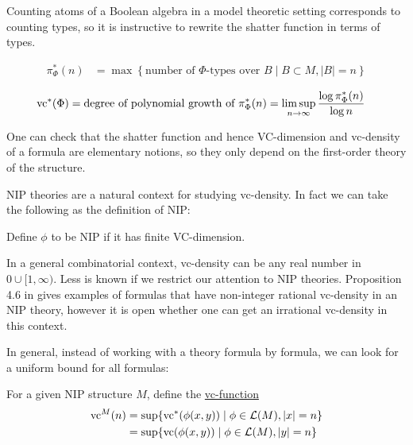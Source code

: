 \documentclass{amsart}
\renewcommand{\LL}{\mathcal L}
\newcommand{\curly}[1]{\left\{#1\right\}}
\newcommand{\defn}{\underline}
\begin{document}
Counting atoms of a Boolean algebra in a model theoretic setting corresponds to counting types,
so it is instructive to rewrite the shatter function in terms of types.

\begin{Definition} 
  \begin{align*}
    \pi^*_\Phi(n) &= \max \curly{\text{number of $\Phi$-types over $B$} \mid B \subset M, |B| = n}
  \end{align*}
\end{Definition}  

\begin{Lemma} \label{count_types}
  \begin{align*}
    \operatorname{vc}^*(\Phi) &= \text{degree of polynomial growth of $\pi^*_\Phi(n)$}  = \limsup_{n \to \infty}\frac{\log \pi^*_\Phi(n)}{\log n}
  \end{align*}  
\end{Lemma}

One can check that the shatter function and hence VC-dimension and vc-density of a formula are elementary notions,
so they only depend on the first-order theory of the structure.

NIP theories are a natural context for studying vc-density.
In fact we can take the following as the definition of NIP:
\begin{Definition}
  Define $\phi$ to be NIP if it has finite VC-dimension. 
\end{Definition}

In a general combinatorial context,
vc-density can be any real number in $0 \cup [1, \infty)$.
Less is known if we restrict our attention to NIP theories.
Proposition 4.6 in \cite{vc_density} gives examples of formulas that have non-integer rational vc-density in an NIP theory,
however it is open whether one can get an irrational vc-density in this context.

In general, instead of working with a theory formula by formula, we can look for a uniform bound for all formulas:
\begin{Definition}
  For a given NIP structure $M$, define the \defn{vc-function}
  \begin{align*}
    \vc^M(n) &= \sup \{\vc^*(\phi(x, y)) \mid \phi \in \LL(M), |x| = n\} \\
             &= \sup \{\vc(\phi(x, y)) \mid \phi \in \LL(M), |y| = n\}
  \end{align*}
\end{Definition}
\end{document}

